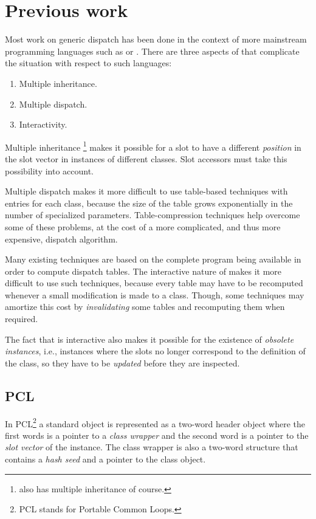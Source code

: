 \section{Previous work}

Most work on generic dispatch has been done in the context of more
mainstream programming languages such as \cplusplus{} or \java{}.
There are three aspects of \cl{} that complicate the situation with
respect to such languages:

\begin{enumerate}
\item Multiple inheritance.
\item Multiple dispatch.
\item Interactivity.
\end{enumerate}

Multiple inheritance%
\footnote{\cplusplus{} also has multiple inheritance of course.}
makes it possible for a slot to have a different \emph{position} in
the slot vector in instances of different classes.  Slot accessors
must take this possibility into account.

Multiple dispatch makes it more difficult to use table-based
techniques with entries for each class, because the size of the table
grows exponentially in the number of specialized parameters.
Table-compression techniques help overcome some of these problems, at
the cost of a more complicated, and thus more expensive, dispatch
algorithm. 

Many existing techniques are based on the complete program being
available in order to compute dispatch tables.  The interactive nature
of \cl{} makes it more difficult to use such techniques, because every
table may have to be recomputed whenever a small modification is made
to a class.  Though, some techniques may amortize this cost by
\emph{invalidating} some tables and recomputing them when required.

The fact that \cl{} is interactive also makes it possible for the
existence of \emph{obsolete instances}, i.e., instances where the
slots no longer correspond to the definition of the class, so they
have to be \emph{updated} before they are inspected.  

\subsection{PCL}

In PCL\footnote{PCL stands for Portable Common Loops.}
\cite{Kiczales:1990:EMD:91556.91600} a standard object is represented
as a two-word header object where the first words is a pointer to a
\emph{class wrapper} and the second word is a pointer to the
\emph{slot vector} of the instance.  The class wrapper is also a
two-word structure that contains a \emph{hash seed} and a pointer to
the class object. 

